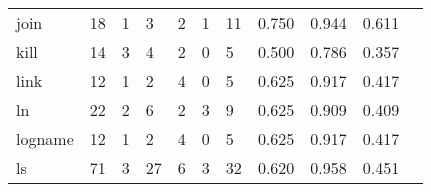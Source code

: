\begin{longtable}{lp{1.20cm}p{1.20cm}p{1.20cm}p{1.20cm}p{1.20cm}p{1.20cm}p{1.20cm}p{1.20cm}p{1.20cm}p{1.20cm}}
join      &                                    18 &                                                  1 &                                                  3 &                                                  2 &                                                  1 &                                                 11 &                                         0.750 &                                              0.944 &                                              0.611 \\
kill      &                                    14 &                                                  3 &                                                  4 &                                                  2 &                                                  0 &                                                  5 &                                         0.500 &                                              0.786 &                                              0.357 \\
link      &                                    12 &                                                  1 &                                                  2 &                                                  4 &                                                  0 &                                                  5 &                                         0.625 &                                              0.917 &                                              0.417 \\
ln        &                                    22 &                                                  2 &                                                  6 &                                                  2 &                                                  3 &                                                  9 &                                         0.625 &                                              0.909 &                                              0.409 \\
logname   &                                    12 &                                                  1 &                                                  2 &                                                  4 &                                                  0 &                                                  5 &                                         0.625 &                                              0.917 &                                              0.417 \\
ls        &                                    71 &                                                  3 &                                                 27 &                                                  6 &                                                  3 &                                                 32 &                                         0.620 &                                              0.958 &                                              0.451 \\

\end{longtable}
